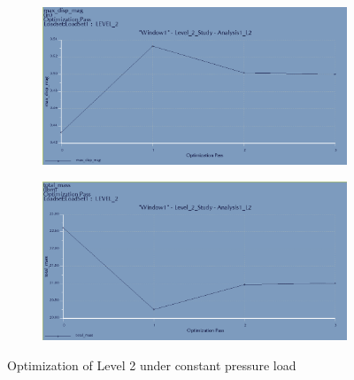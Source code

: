 \documentclass[12pt,letterpaper]{report}
\begin{document}
		\begin{figure}[H]
			\centering
			\begin{subfigure}{.45\textwidth}
				\includegraphics[width=\textwidth]{L2OptimDisp}
				\label{fig:L2PressureOptimDispGraph}
			\end{subfigure}
			\begin{subfigure}{.45\textwidth}
				\includegraphics[width=\textwidth]{L2OptimMass}
				\label{fig:L2PressureOptimMassGraph}
			\end{subfigure}
			\caption{Optimization of Level 2 under constant pressure load}
		\end{figure}
		\graphicspath{ {..} }
		
		
		\newpage
\end{document}
